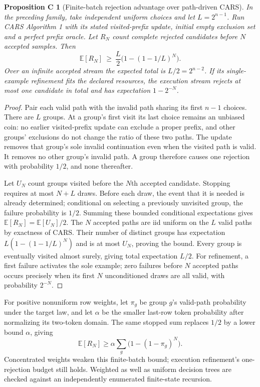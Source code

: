 \documentclass[11pt,a4paper]{article}
\newtheorem{streamcost}{Proposition C}
\begin{document}
\begin{streamcost}[Finite-batch rejection advantage over path-driven CARS]
In the preceding family, take independent uniform choices and let
$L=2^{n-1}$. Run CARS Algorithm 1 with its stated visited-prefix update,
initial empty exclusion set and a perfect prefix oracle. Let $R_N$ count
complete rejected candidates before $N$ accepted samples. Then
\[
 \mathbb E[R_N]\ \geq\ \frac L2\bigl(1-(1-1/L)^N\bigr).
\]
Over an infinite accepted stream the expected total is $L/2=2^{n-2}$.
If its single-example refinement fits the declared resources, the execution
stream rejects at most one candidate in total and has expectation $1-2^{-N}$.
\end{streamcost}
\begin{proof}
Pair each valid path with the invalid path sharing its first $n-1$ choices.
There are $L$ groups. At a group's first visit its last choice remains an
unbiased coin: no earlier visited-prefix update can exclude a proper prefix,
and other groups' exclusions do not change the ratio of these two paths.
The update removes that group's sole invalid continuation even when the
visited path is valid. It removes no other group's invalid path. A group
therefore causes one rejection with probability $1/2$, and none thereafter.

Let $U_N$ count groups visited before the $N$th accepted candidate. Stopping
requires at most $N+L$ draws. Before each draw, the event that it is needed is
already determined; conditional on selecting a previously unvisited group,
the failure probability is $1/2$. Summing these bounded conditional
expectations gives $\mathbb E[R_N]=\mathbb E[U_N]/2$. The $N$ accepted paths
are iid uniform on the $L$ valid paths by exactness of CARS. Their number of
distinct groups has expectation $L(1-(1-1/L)^N)$ and is at most $U_N$, proving
the bound. Every group is eventually visited almost surely, giving total
expectation $L/2$. For refinement, a first failure activates the sole example;
zero failures before $N$ accepted paths occurs precisely when its first $N$
unconditioned draws are all valid, with probability $2^{-N}$.
\end{proof}

For positive nonuniform row weights, let $\pi_g$ be group $g$'s valid-path
probability under the target law, and let $\alpha$ be the smaller last-row
token probability after normalizing its two-token domain. The same stopped
sum replaces $1/2$ by a lower bound $\alpha$, giving
\[
 \mathbb E[R_N]\geq\alpha\sum_g\bigl(1-(1-\pi_g)^N\bigr).
\]
Concentrated weights weaken this finite-batch bound; execution refinement's
one-rejection budget still holds. Weighted as well as uniform decision trees
are checked against an independently enumerated finite-state recursion.
\end{document}
